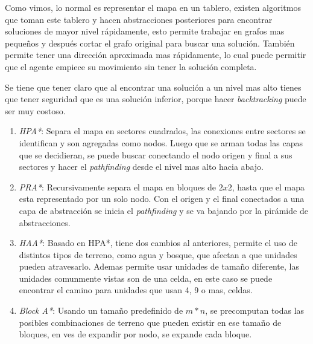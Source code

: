 Como vimos, lo normal es representar el mapa en un tablero, existen algoritmos que toman este tablero y hacen abstracciones posteriores para encontrar soluciones de mayor nivel rápidamente, esto permite trabajar en grafos mas pequeños y después cortar el grafo original para buscar una solución. También permite tener una dirección aproximada mas rápidamente, lo cual puede permitir que el agente empiece su movimiento sin tener la solución completa.

Se tiene que tener claro que al encontrar una solución a un nivel mas alto tienes que tener seguridad que es una solución inferior, porque hacer \textit{backtracking} puede ser muy costoso.

\begin{enumerate}

\item \textit{HPA*}: \cite{botea2004near} Separa el mapa en sectores cuadrados, las conexiones entre sectores se identifican y son agregadas como nodos. Luego que se arman todas las capas que se decidieran, se puede buscar conectando el nodo origen y final a sus sectores y hacer el \textit{pathfinding} desde el nivel mas alto hacia abajo.

\item \textit{PRA*}: \cite{sturtevant2005partial} Recursivamente separa el mapa en bloques de $2x2$, hasta que el mapa esta representado por un solo nodo. Con el origen y el final conectados a una capa de abstracción se inicia el \textit{pathfinding} y se va bajando por la pirámide de abstracciones.

\item \textit{HAA*}: \cite{harabor2008hierarchical} Basado en HPA*, tiene dos cambios al anteriores, permite el uso de distintos tipos de terreno, como agua y bosque, que afectan a que unidades pueden atravesarlo. Ademas permite usar unidades de tamaño diferente, las unidades comunmente vistas son de una celda, en este caso se puede encontrar el camino para unidades que usan 4, 9 o mas, celdas.

\item \textit{Block A*}: \cite{yap2011block} Usando un tamaño predefinido de $m * n$, se precomputan todas las posibles combinaciones de terreno que pueden existir en ese tamaño de bloques, en ves de expandir por nodo, se expande cada bloque.


\end{enumerate}







